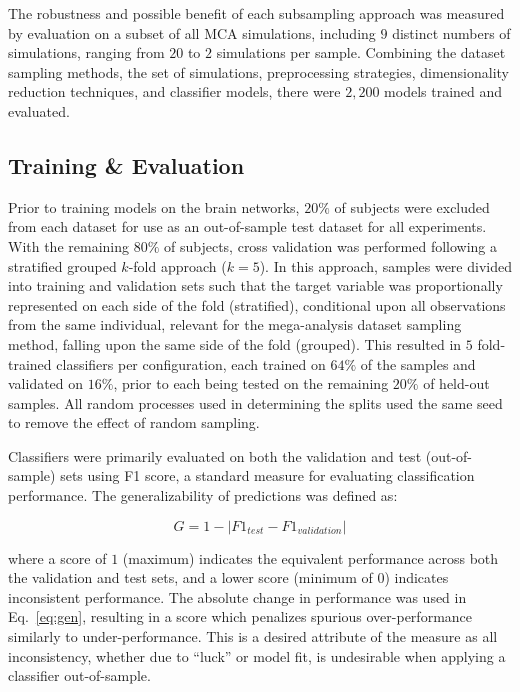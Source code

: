 \documentclass[10pt]{SelfArx} %
\begin{document}
The robustness and possible benefit of each subsampling approach was measured by evaluation on a subset of all MCA
simulations, including $9$ distinct numbers of simulations, ranging from $20$ to $2$ simulations per sample. Combining
the dataset sampling methods, the set of simulations, preprocessing strategies, dimensionality reduction techniques,
and classifier models, there were $2,200$ models trained and evaluated.

\subsection*{Training \& Evaluation}

Prior to training models on the brain networks, $20\%$ of subjects were excluded from each dataset for use as an
out-of-sample test dataset for all experiments. With the remaining $80\%$ of subjects, cross validation was performed
following a stratified grouped $k$-fold approach ($k=5$). In this approach, samples were divided into training and
validation sets such that the target variable was proportionally represented on each side of the fold (stratified),
conditional upon all observations from the same individual, relevant for the mega-analysis dataset sampling method,
falling upon the same side of the fold (grouped). This resulted in $5$ fold-trained classifiers per configuration, each
trained on $64\%$ of the samples and validated on $16\%$, prior to each being tested on the remaining $20\%$ of
held-out samples. All random processes used in determining the splits used the same seed to remove the effect of random
sampling.

Classifiers were primarily evaluated on both the validation and test (out-of-sample) sets using F1 score, a standard
measure for evaluating classification performance. The generalizability of predictions was defined as:

\begin{equation}
G = 1 - \lvert F1_{test} - F1_{validation} \rvert
\label{eq:gen}
\end{equation}

where a score of $1$ (maximum) indicates the equivalent performance across both the validation and test sets, and a
lower score (minimum of $0$) indicates inconsistent performance. The absolute change in performance was used in
Eq.~\ref{eq:gen}, resulting in a score which penalizes spurious over-performance similarly to under-performance. This
is a desired attribute of the measure as all inconsistency, whether due to ``luck'' or model fit, is undesirable when
applying a classifier out-of-sample.
\end{document}
